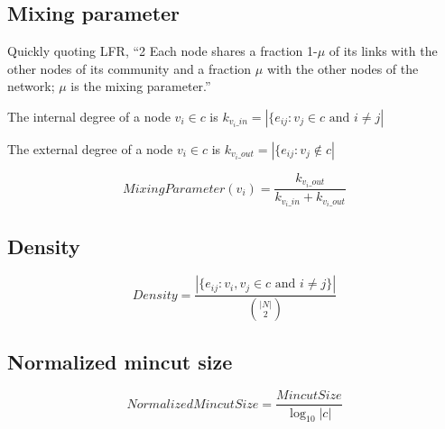 \documentclass[aps,pre,superscriptaddress]{revtex4}
\begin{document}
\subsection{Mixing parameter}
Quickly quoting LFR, ``2 Each node shares a fraction 1-$\mu$ of its links with the other nodes of its community and a fraction $\mu$ with the other nodes of the network; $\mu$ is the mixing parameter.''

The internal degree of a node $v_{i} \in c$ is $k_{v_{i}\_{in}}=|\{e_{ij} :v_{j} \in c \text{ and } i \neq j|$

The external degree of a node $v_{i} \in c$ is $k_{v_{i}\_{out}}=|\{e_{ij} :v_{j} \notin c |$

\begin{equation}
MixingParameter(v_{i}) = \frac{k_{v_{i}\_out}}{k_{v_{i}\_in} + k_{v_{i}\_out}}
\end{equation}

\subsection{Density}
\begin{equation}
Density=\frac{|\{e_{ij} : v_{i},v_{j} \in c \text{ and } i \neq j\}|}{{|N|\choose 2}}
\end{equation}

\subsection{Normalized mincut size}
\begin{equation}
NormalizedMincutSize=\frac{MincutSize}{\log_{10}{|c|}}
\end{equation}






\clearpage


\end{document}
